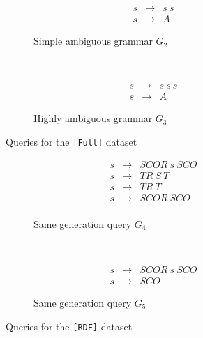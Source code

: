 \begin{figure}[h]
    \centering
    \begin{subfigure}[b]{0.24\textwidth}
        \centering
        \[
         \begin{array}{rcl}
           s & \rightarrow & s \ s \\
           s & \rightarrow & A
         \end{array}
         \]
        \caption{Simple ambiguous grammar $G_2$}
    \end{subfigure}%
    ~
    \begin{subfigure}[b]{0.24\textwidth}
        \centering
        \[
         \begin{array}{rcl}
           s & \rightarrow & s \ s \ s \\
           s & \rightarrow & A
         \end{array}
         \]
        \caption{Highly ambiguous grammar $G_3$}
    \end{subfigure}
    \caption{Queries for the \texttt{[Full]} dataset}
    \label{fig:grammar_full}
\end{figure}

\begin{figure}[h]
    \centering
    \begin{subfigure}[b]{0.24\textwidth}
        \centering
        \[
         \begin{array}{rcl}
           s & \rightarrow & SCOR \ s \ SCO \\
           s & \rightarrow & TR \ S \ T     \\
           s & \rightarrow & TR \ T     \\
           s & \rightarrow & SCOR \ SCO     \\
         \end{array}
         \]
        \caption{Same generation query $G_4$}
    \end{subfigure}%
    ~
    \begin{subfigure}[b]{0.24\textwidth}
        \centering
        \[
         \begin{array}{rcl}
           s & \rightarrow & SCOR \ s \ SCO \\
           s & \rightarrow & SCO
         \end{array}
         \]
        \caption{Same generation query $G_5$}
    \end{subfigure}
    \caption{Queries for the \texttt{[RDF]} dataset}
    \label{fig:grammar_rdf}
\end{figure}
